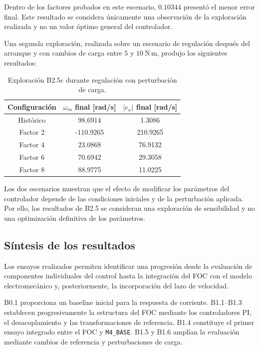 Dentro de los factores probados en este escenario, \(0.10344\) presentó el menor error final. Este resultado se considera únicamente una observación de la exploración realizada y no un valor óptimo general del controlador.

Una segunda exploración, realizada sobre un escenario de regulación después del arranque y con cambios de carga entre \(5\) y \(10~\mathrm{N\,m}\), produjo los siguientes resultados:

\begin{table}[H]
\centering
\caption{Exploración B2.5c durante regulación con perturbación de carga.}
\label{tab:b2_5c}
\begin{tabular}{ccc}
\toprule
\textbf{Configuración} & \(\omega_m\) final [rad/s] & \(|e_\omega|\) final [rad/s] \\
\midrule
Histórico & 98.6914 & 1.3086 \\
Factor 2 & -110.9265 & 210.9265 \\
Factor 4 & 23.0868 & 76.9132 \\
Factor 6 & 70.6942 & 29.3058 \\
Factor 8 & 88.9775 & 11.0225 \\
\bottomrule
\end{tabular}
\end{table}

Los dos escenarios muestran que el efecto de modificar los parámetros del controlador depende de las condiciones iniciales y de la perturbación aplicada. Por ello, los resultados de B2.5 se consideran una exploración de sensibilidad y no una optimización definitiva de los parámetros.

\subsection{Síntesis de los resultados}

Los ensayos realizados permiten identificar una progresión desde la evaluación de componentes individuales del control hasta la integración del FOC con el modelo electromecánico y, posteriormente, la incorporación del lazo de velocidad.

B0.1 proporciona un baseline inicial para la respuesta de corriente. B1.1--B1.3 establecen progresivamente la estructura del FOC mediante los controladores PI, el desacoplamiento y las transformaciones de referencia. B1.4 constituye el primer ensayo integrado entre el FOC y \texttt{M4\_BASE}. B1.5 y B1.6 amplían la evaluación mediante cambios de referencia y perturbaciones de carga.

